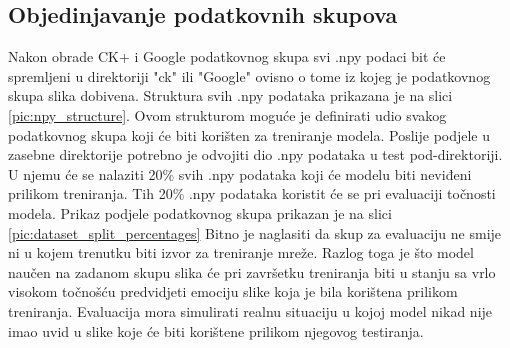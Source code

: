 \documentclass[times, utf8, zavrsni,numeric,pstricks]{fer}
\begin{document}
\subsection{Objedinjavanje podatkovnih skupova}
Nakon obrade CK+ i Google podatkovnog skupa svi .npy podaci bit će spremljeni u direktoriji "ck" ili "Google" ovisno o tome iz kojeg je podatkovnog skupa slika dobivena. Struktura svih .npy podataka prikazana je na slici \ref{pic:npy_structure}. Ovom strukturom moguće je definirati udio svakog podatkovnog skupa koji će biti korišten za treniranje modela. Poslije podjele u zasebne direktorije potrebno je odvojiti dio .npy podataka u test pod-direktoriji. U njemu će se nalaziti 20\% svih .npy podataka koji će modelu biti neviđeni prilikom treniranja. Tih 20\% .npy podataka koristit će se pri evaluaciji točnosti modela. Prikaz podjele podatkovnog skupa prikazan je na slici \ref{pic:dataset_split_percentages} Bitno je naglasiti da skup za evaluaciju ne smije ni u kojem trenutku biti izvor za treniranje mreže. Razlog toga je što model naučen na zadanom skupu slika će pri završetku treniranja biti u stanju sa vrlo visokom točnošću predvidjeti emociju slike koja je bila korištena prilikom treniranja. Evaluacija mora simulirati realnu situaciju u kojoj model nikad nije imao uvid u slike koje će biti korištene prilikom njegovog testiranja.
\end{document}
